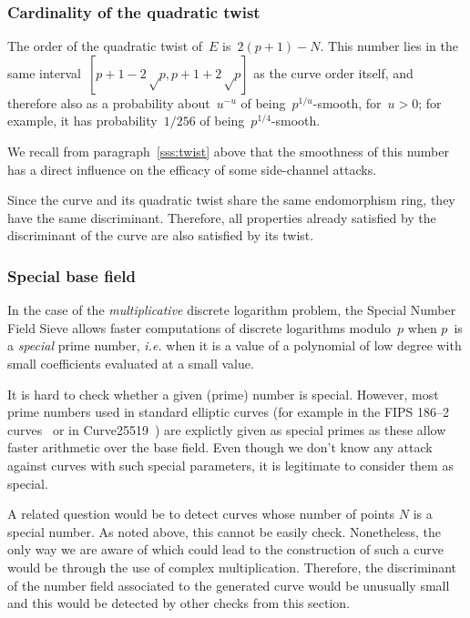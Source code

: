 \documentclass[twocolumn,letterpaper]{article}
\begin{document}
\subsubsection{Cardinality of the quadratic twist}
\label{sss:normal-twist}

The order of the quadratic twist of~$E$ is~$2(p+1) - N$.
This number lies in the same interval~$[p+1-2√p, p+1+2√p]$
as the curve order itself,
and therefore also as a probability about~$u^{-u}$
of being~$p^{1/u}$-smooth, for~$u > 0$;
for example, it has probability~$1/256$ of being~$p^{1/4}$-smooth.

We recall from paragraph~\ref{sss:twist} above
that the smoothness of this number has a direct influence
on the efficacy of some side-channel attacks.

Since the curve and its quadratic twist
share the same endomorphism ring,
they have the same discriminant.
Therefore, all properties already satisfied
by the discriminant of the curve are also satisfied by its twist.

\subsubsection{Special base field}
\label{sss:special-anormal}

In the case of the \emph{multiplicative} discrete logarithm problem,
the Special Number Field Sieve allows faster computations
of discrete logarithms modulo~$p$
when $p$~is a \emph{special} prime number,
\emph{i.e.} when it is a value of a polynomial of low degree
with small coefficients evaluated at a small value.

It is hard to check whether a given (prime) number is special.
However, most prime numbers used in standard elliptic curves
(for example in the FIPS 186--2 curves~\cite{nist2000fips186-2}
or in Curve25519~\cite{pkc2006bernstein})
are explictly given as special primes as these allow faster arithmetic
over the base field.
Even though we don't know any attack against curves with such special
parameters, it is legitimate to consider them as special.

A related question would be to detect curves whose number of points $N$
is a special number.
As noted above, this cannot be easily check.
Nonetheless, the only way we are aware of which could lead to the construction
of such a curve would be through the use of complex multiplication.
Therefore, the discriminant of the number field associated
to the generated curve would be unusually small and this would be detected by
other checks from this section.
\end{document}
